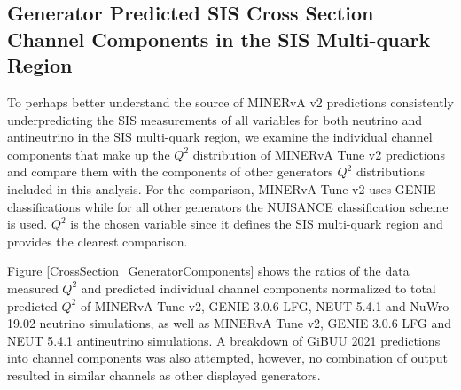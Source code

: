 \documentclass[aps, prd, twocolumn, showpacs, superscriptaddress, floatfix]{revtex4-2}
\begin{document}
\subsection{Generator Predicted SIS Cross Section Channel Components in the SIS Multi-quark Region}
To perhaps better understand the source of MINERvA v2 predictions consistently underpredicting the SIS measurements of all variables for both neutrino and antineutrino in the SIS multi-quark region, we examine the individual channel components that make up the $Q^2$ distribution of MINERvA Tune v2 predictions and compare them with the components of other generators $Q^2$ distributions included in this analysis. For the comparison, MINERvA Tune v2 uses GENIE classifications while for all other generators the NUISANCE \cite{Stowell:2016jfr} classification scheme is used. $Q^2$ is the chosen variable since it defines the SIS multi-quark region and provides the clearest comparison.

Figure \ref{CrossSection_GeneratorComponents} shows the ratios of the data measured $Q^2$ and predicted individual channel components normalized to total predicted $Q^2$ of MINERvA Tune v2, GENIE 3.0.6 LFG, NEUT 5.4.1 and NuWro 19.02 neutrino simulations, as well as MINERvA Tune v2, GENIE 3.0.6 LFG and NEUT 5.4.1 antineutrino simulations. A breakdown of GiBUU 2021 predictions into channel components was also attempted, however, no combination of output resulted in similar channels as other displayed generators.
\end{document}
